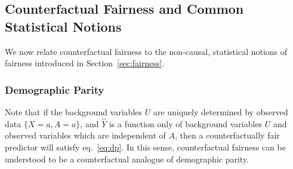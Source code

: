 \documentclass{article}
\begin{document}






\subsection{Counterfactual Fairness and Common Statistical Notions}
We now relate counterfactual fairness to the non-causal, statistical notions of fairness introduced in Section~\ref{sec:fairness}.

\subsubsection{Demographic Parity}
Note that if the background variables $U$ are
uniquely determined by observed data $\{X = a, A = a\}$, and $\hat{Y}$ is a
function only of background variables $U$ and observed variables which are independent of $A$, then a counterfactually fair predictor will satisfy eq.~\eqref{eq:dp}. In this sense,
counterfactual fairness can be understood to be a counterfactual analogue of
demographic parity.
\end{document}
